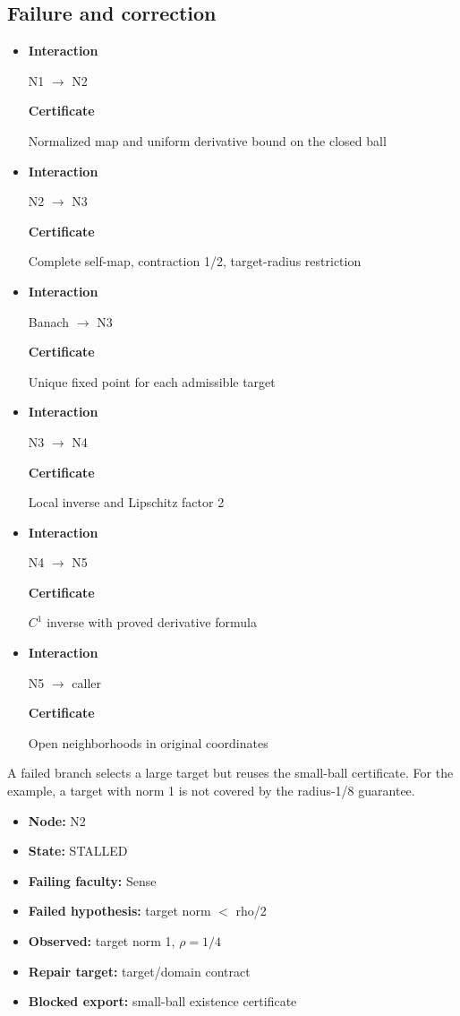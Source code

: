 \documentclass[preprint,12pt,aps,pra,showkeys,amsmath,amssymb,superscriptaddress,floatfix]{revtex4-2}
\theoremstyle{definition}
\theoremstyle{remark}
\begin{document}
\subsection{Failure and correction}
\begin{itemize}
\item
  \textbf{Interaction}

  N1 \(\to\) N2

  \textbf{Certificate}

  Normalized map and uniform derivative bound on the closed ball
\item
  \textbf{Interaction}

  N2 \(\to\) N3

  \textbf{Certificate}

  Complete self-map, contraction 1/2, target-radius restriction
\item
  \textbf{Interaction}

  Banach \(\to\) N3

  \textbf{Certificate}

  Unique fixed point for each admissible target
\item
  \textbf{Interaction}

  N3 \(\to\) N4

  \textbf{Certificate}

  Local inverse and Lipschitz factor 2
\item
  \textbf{Interaction}

  N4 \(\to\) N5

  \textbf{Certificate}

  \(C^{1}\) inverse with proved derivative formula
\item
  \textbf{Interaction}

  N5 \(\to\) caller

  \textbf{Certificate}

  Open neighborhoods in original coordinates
\end{itemize}

A failed branch selects a large target but reuses the small-ball
certificate. For the example, a target with norm 1 is not covered by the
radius-1/8 guarantee.

\begin{itemize}
\item
  \textbf{Node:} N2
\item
  \textbf{State:} STALLED
\item
  \textbf{Failing faculty:} Sense
\item
  \textbf{Failed hypothesis:} target norm \(<\) rho/2
\item
  \textbf{Observed:} target norm 1, \(\rho =1/4\)
\item
  \textbf{Repair target:} target/domain contract
\item
  \textbf{Blocked export:} small-ball existence certificate
\end{itemize}
\end{document}

